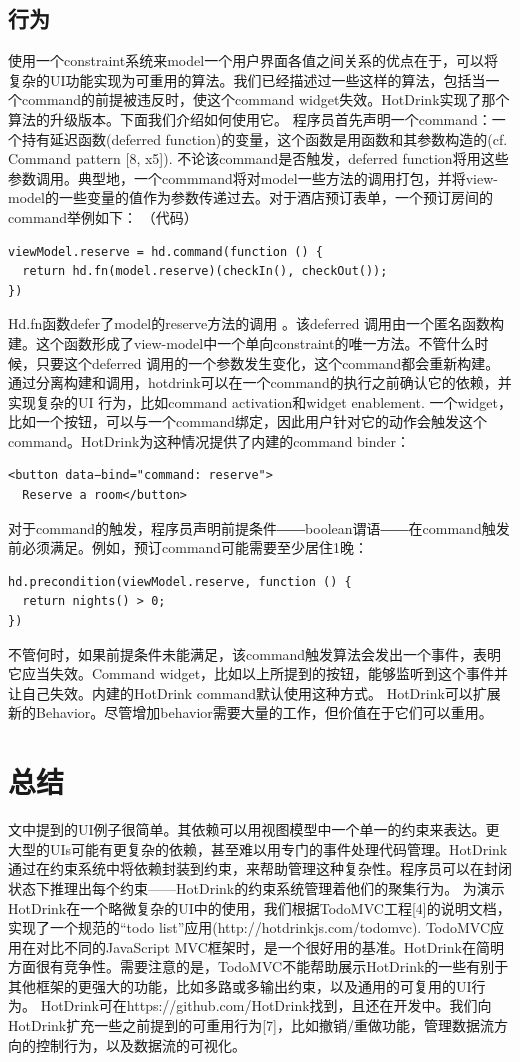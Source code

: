 \subsection*{行为}
使用一个constraint系统来model一个用户界面各值之间关系的优点在于，可以将复杂的UI功能实现为可重用的算法。我们已经描述过一些这样的算法，包括当一个command的前提被违反时，使这个command widget失效。HotDrink实现了那个算法的升级版本。下面我们介绍如何使用它。
程序员首先声明一个command：一个持有延迟函数(deferred function)的变量，这个函数是用函数和其参数构造的(cf. Command pattern [8, x5]). 不论该command是否触发，deferred function将用这些参数调用。典型地，一个commmand将对model一些方法的调用打包，并将view-model的一些变量的值作为参数传递过去。对于酒店预订表单，一个预订房间的command举例如下：
（代码）
\begin{verbatim}
viewModel.reserve = hd.command(function () {
  return hd.fn(model.reserve)(checkIn(), checkOut());
})
\end{verbatim}
Hd.fn函数defer了model的reserve方法的调用 。该deferred 调用由一个匿名函数构建。这个函数形成了view-model中一个单向constraint的唯一方法。不管什么时候，只要这个deferred 调用的一个参数发生变化，这个command都会重新构建。通过分离构建和调用，hotdrink可以在一个command的执行之前确认它的依赖，并实现复杂的UI 行为，比如command activation和widget enablement.
一个widget，比如一个按钮，可以与一个command绑定，因此用户针对它的动作会触发这个command。HotDrink为这种情况提供了内建的command binder：
\begin{verbatim}
<button data−bind="command: reserve">
  Reserve a room</button>
\end{verbatim}
对于command的触发，程序员声明前提条件――boolean谓语――在command触发前必须满足。例如，预订command可能需要至少居住1晚：
\begin{verbatim}
hd.precondition(viewModel.reserve, function () {
  return nights() > 0;
})
\end{verbatim}
不管何时，如果前提条件未能满足，该command触发算法会发出一个事件，表明它应当失效。Command widget，比如以上所提到的按钮，能够监听到这个事件并让自己失效。内建的HotDrink command默认使用这种方式。
HotDrink可以扩展新的Behavior。尽管增加behavior需要大量的工作，但价值在于它们可以重用。
\section*{总结}
文中提到的UI例子很简单。其依赖可以用视图模型中一个单一的约束来表达。更大型的UIs可能有更复杂的依赖，甚至难以用专门的事件处理代码管理。HotDrink通过在约束系统中将依赖封装到约束，来帮助管理这种复杂性。程序员可以在封闭状态下推理出每个约束——HotDrink的约束系统管理着他们的聚集行为。
为演示HotDrink在一个略微复杂的UI中的使用，我们根据TodoMVC工程[4]的说明文档，实现了一个规范的“todo list”应用(http://hotdrinkjs.com/todomvc). TodoMVC应用在对比不同的JavaScript MVC框架时，是一个很好用的基准。HotDrink在简明方面很有竞争性。需要注意的是，TodoMVC不能帮助展示HotDrink的一些有别于其他框架的更强大的功能，比如多路或多输出约束，以及通用的可复用的UI行为。
HotDrink可在https://github.com/HotDrink找到，且还在开发中。我们向HotDrink扩充一些之前提到的可重用行为[7]，比如撤销/重做功能，管理数据流方向的控制行为，以及数据流的可视化。
